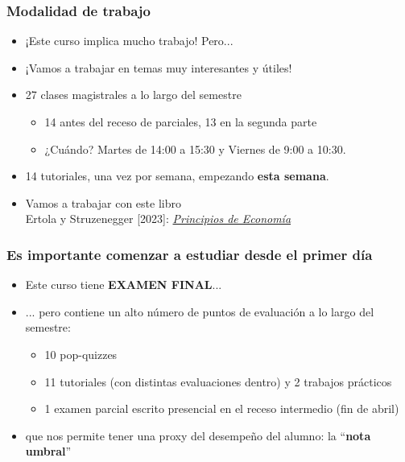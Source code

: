 \documentclass{beamer}
\begin{document}
\begin{frame}
    \frametitle{Modalidad de trabajo}
    \begin{itemize}
        \item ¡Este curso implica mucho trabajo! Pero...  \vspace{2mm}
        \item ¡Vamos a trabajar en temas muy interesantes y útiles!  \vspace{2mm}
        \item 27 clases magistrales a lo largo del semestre 
            \begin{itemize}
            \vspace{2mm}
                \item 14 antes del receso de parciales, 13 en la segunda parte \vspace{2mm}
                \item ¿Cuándo? Martes de 14:00 a 15:30 y Viernes de 9:00 a 10:30.  \vspace{2mm}
            \end{itemize} 
        \item 14 tutoriales, una vez por semana, empezando \textbf{esta semana}. \vspace{2mm}
        \item Vamos a trabajar con este libro \vspace{2mm}  \\
         Ertola y Struzenegger [2023]:  \textit{\href{https://principiosdeeconomia.com}{Principios de Economía}} \vspace{2mm} 
    \end{itemize}
\end{frame}

\begin{frame}
    \frametitle{Es importante comenzar a estudiar desde el primer día}
    \begin{itemize}
        \item Este curso tiene \textbf{EXAMEN FINAL}... \vspace{2mm}
        \item ... pero contiene un alto número de puntos de evaluación a lo largo del semestre: \vspace{2mm}
        \begin{itemize}
            \item 10 pop-quizzes
            \item 11 tutoriales (con distintas evaluaciones dentro) y 2 trabajos prácticos
            \item 1 examen parcial escrito presencial en el receso intermedio (fin de abril)
        \end{itemize} \vspace{2mm}
        \item que nos permite tener una proxy del desempeño del alumno: la ``\textbf{nota umbral}''
    \end{itemize}
\end{frame}
\end{document}
